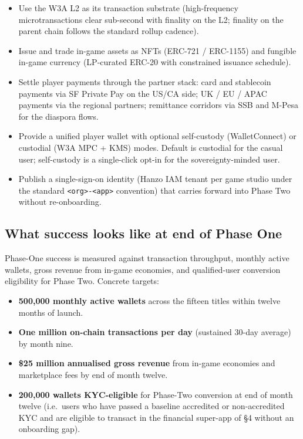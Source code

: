 \begin{itemize}[leftmargin=2em,itemsep=0.1em]
\item Use the W3A L2 as its transaction substrate (high-frequency
microtransactions clear sub-second with finality on the L2; finality on
the parent chain follows the standard rollup cadence).
\item Issue and trade in-game assets as NFTs (ERC-721 / ERC-1155) and
fungible in-game currency (LP-curated ERC-20 with constrained
issuance schedule).
\item Settle player payments through the partner stack: card and
stablecoin payments via SF Private Pay on the US/CA side; UK / EU /
APAC payments via the regional partners; remittance corridors via SSB
and M-Pesa for the diaspora flows.
\item Provide a unified player wallet with optional self-custody
(WalletConnect) or custodial (W3A MPC + KMS) modes. Default is custodial
for the casual user; self-custody is a single-click opt-in for the
sovereignty-minded user.
\item Publish a single-sign-on identity (Hanzo IAM tenant per game studio
under the standard \texttt{<org>-<app>} convention) that carries
forward into Phase Two without re-onboarding.
\end{itemize}

\subsection{What success looks like at end of Phase One}

Phase-One success is measured against transaction throughput, monthly
active wallets, gross revenue from in-game economies, and qualified-user
conversion eligibility for Phase Two. Concrete targets:

\begin{itemize}[leftmargin=2em,itemsep=0.1em]
\item \textbf{500,000 monthly active wallets} across the fifteen titles
within twelve months of launch.
\item \textbf{One million on-chain transactions per day} (sustained
30-day average) by month nine.
\item \textbf{\$25 million annualised gross revenue} from in-game
economies and marketplace fees by end of month twelve.
\item \textbf{200,000 wallets KYC-eligible} for Phase-Two conversion at
end of month twelve (i.e.\ users who have passed a baseline accredited
or non-accredited KYC and are eligible to transact in the financial
super-app of \S 4 without an onboarding gap).
\end{itemize}

